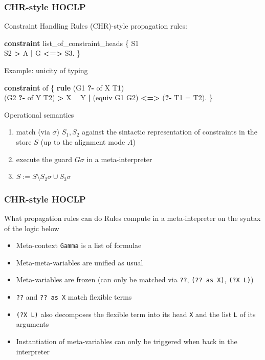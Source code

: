 \documentclass{beamer}
\begin{document}
\begin{frame}[fragile]
 \frametitle{CHR-style HOCLP}

\begin{block}{Constraint Handling Rules (CHR)-style propagation rules:}
{\small \begin{semiverbatim}
\textbf{constraint} list_of_constraint_heads \{
  S1 \textbf{\\} S2 \textbf{>} A \textbf{|} G \textbf{<=>} S3.
\}
\end{semiverbatim}}
\end{block}

\begin{block}{Example: unicity of typing}
{\small \begin{semiverbatim}
\textbf{constraint} of \{
  \textbf{rule} (G1 \textbf{?-} of X T1) \textbf{\\} (G2 \textbf{?-} of Y T2) \textbf{>} X \textbf{~} Y
       \textbf{|} (equiv G1 G2) \textbf{<=>} (\textbf{?-} T1 = T2).
\}
\end{semiverbatim}}
\end{block}

 \begin{block}{Operational semantics}
  \begin{enumerate}
   \item match (via $\sigma$) $S_1,S_2$ against the \alert{sintactic representation} of constraints in the store $S$ (up to the alignment mode $A$)
   \item execute the guard $G \sigma$ in a \alert{meta-interpreter}
   \item $S := S \setminus S_2 \sigma \cup S_3 \sigma$
  \end{enumerate}
 \end{block}
\end{frame}

\begin{frame}[fragile]
 \frametitle{CHR-style HOCLP}
 \begin{block}{What propagation rules can do}
  Rules compute in a meta-intepreter on the syntax of the logic below
  \begin{itemize}
   \item \alert{Meta-context} \texttt{Gamma} is a list of formulae
   \item \alert{Meta-meta-variables} are unified as usual
   \item \alert{Meta-variables are frozen} (can only be matched via \texttt{??}, \texttt{(?? as X)}, \texttt{(?X L)})
   \item \texttt{??} and \texttt{?? as X} match flexible terms
   \item \texttt{(?X L)} also \alert{decomposes} the flexible term into its head \texttt{X} and the list \texttt{L} of its arguments
   \item Instantiation of meta-variables can only be triggered when back in
    the interpreter
  \end{itemize}
 \end{block}
\end{frame}
\end{document}
